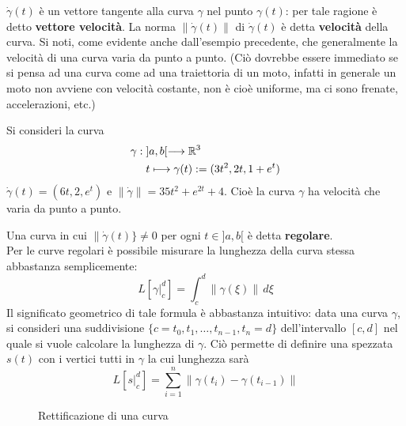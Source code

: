 $\dot\gamma(t)$ è un vettore tangente alla curva $\gamma$ nel punto 
$\gamma(t)$: 
per tale ragione è detto \textbf{vettore velocità}. La norma 
$\|\dot\gamma(t)\|$ di 
$\dot\gamma(t)$ è  detta \textbf{velocità} della curva. Si noti, come 
evidente anche 
dall'esempio precedente, che generalmente la velocità di una curva varia da 
punto a punto.
(Ciò dovrebbe essere immediato se si pensa ad una curva come ad una 
traiettoria
di un moto, infatti in generale un moto non avviene con velocità costante, 
non è 
cioè uniforme, ma ci sono frenate, accelerazioni, etc.)

\begin{esempio}
  Si consideri la curva
  \[\begin{aligned}
    \gamma: & \; ]a,b[ \longrightarrow \mathbb{R}^{3}\\
    &\;  t\longmapsto \gamma(t):= (3t^2,2t,1+e^t)
  \end{aligned}\]  
  $\dot\gamma(t) = (6t,2,e^t)$ e $\|\dot\gamma\| = 35t^2+e^{2t}+4$.
  Cioè la curva $\gamma$ ha velocità che varia da punto a punto.
\end{esempio}
Una curva in cui $\|\dot\gamma(t)\}\ne0$ per ogni $t\in]a,b[$ è detta \textbf{
regolare}.\\
Per le curve regolari è possibile misurare la lunghezza della curva stessa 
abbastanza
semplicemente:
\[
  L[\gamma|^d_c] = \int_c^d \|\gamma(\xi)\| \, d\xi
\]
Il significato geometrico di tale formula è abbastanza intuitivo: data una 
curva $\gamma$,
si consideri una suddivisione $\{c=t_0,t_1,\ldots,t_{n-1},t_n=d\}$ 
dell'intervallo $[c,d]$ nel quale si vuole calcolare la lunghezza 
di $\gamma$. Ciò permette di definire una spezzata $s(t)$ con i vertici tutti 
in $\gamma$
la cui lunghezza sarà
\[
  L[s|_c^d] = \sum_{i=1}^n \| \gamma(t_i)-\gamma(t_{i-1}) \|
\]
\begin{figure}[h!]
\begin{center}
{\small
\begin{inaccessibleblock}[TODO.]
{}
\end{inaccessibleblock}
}
\caption{\small Rettificazione di una curva}\label{fig:???}
\end{center}
\end{figure}
